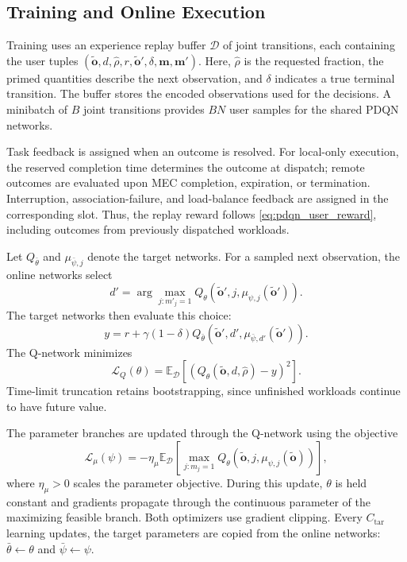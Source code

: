 \documentclass[journal]{IEEEtran}
\begin{document}
\subsection{Training and Online Execution}
\label{subsec:training_execution}

Training uses an experience replay buffer $\mathcal{D}$
of joint transitions, each containing the user tuples
$(\widetilde{\mathbf{o}},d,\widehat{\rho},r,
\widetilde{\mathbf{o}}',\delta,\mathbf{m},\mathbf{m}')$.
Here, $\widehat{\rho}$ is the requested fraction,
the primed quantities describe the next observation,
and $\delta$ indicates a true terminal transition.
The buffer stores the encoded observations used for
the decisions. A minibatch of $B$ joint transitions
provides $BN$ user samples for the shared PDQN networks.

Task feedback is assigned when an outcome is resolved.
For local-only execution, the reserved completion time
determines the outcome at dispatch; remote outcomes
are evaluated upon MEC completion, expiration, or
termination. Interruption, association-failure, and
load-balance feedback are assigned in the corresponding
slot. Thus, the replay reward follows
\eqref{eq:pdqn_user_reward}, including outcomes from
previously dispatched workloads.

Let $Q_{\bar{\theta}}$ and $\mu_{\bar{\psi},j}$
denote the target networks. For a sampled next observation,
the online networks select
\begin{equation}
d'
=
\arg\max_{j:m'_j=1}
Q_\theta\left(
\widetilde{\mathbf{o}}',j,
\mu_{\psi,j}(\widetilde{\mathbf{o}}')
\right).
\label{eq:pdqn_next_action}
\end{equation}
The target networks then evaluate this choice:
\begin{equation}
y
=
r+\gamma(1-\delta)
Q_{\bar{\theta}}\left(
\widetilde{\mathbf{o}}',d',
\mu_{\bar{\psi},d'}(\widetilde{\mathbf{o}}')
\right).
\label{eq:pdqn_td_target}
\end{equation}
The Q-network minimizes
\begin{equation}
\mathcal{L}_Q(\theta)
=
\mathbb{E}_{\mathcal{D}}
\left[
\left(
Q_\theta(\widetilde{\mathbf{o}},d,\widehat{\rho})-y
\right)^2
\right].
\label{eq:pdqn_q_loss}
\end{equation}
Time-limit truncation retains bootstrapping, since
unfinished workloads continue to have future value.

The parameter branches are updated through the Q-network
using the objective
\begin{equation}
\mathcal{L}_{\mu}(\psi)
=
-\eta_{\mu}
\mathbb{E}_{\mathcal{D}}
\left[
\max_{j:m_j=1}
Q_\theta\left(
\widetilde{\mathbf{o}},j,
\mu_{\psi,j}(\widetilde{\mathbf{o}})
\right)
\right],
\label{eq:pdqn_parameter_loss}
\end{equation}
where $\eta_{\mu}>0$ scales the parameter objective.
During this update, $\theta$ is held constant and
gradients propagate through the continuous parameter
of the maximizing feasible branch.
Both optimizers use gradient clipping.
Every $C_{\mathrm{tar}}$ learning updates, the target
parameters are copied from the online networks:
$\bar{\theta}\leftarrow\theta$ and
$\bar{\psi}\leftarrow\psi$.
\end{document}
